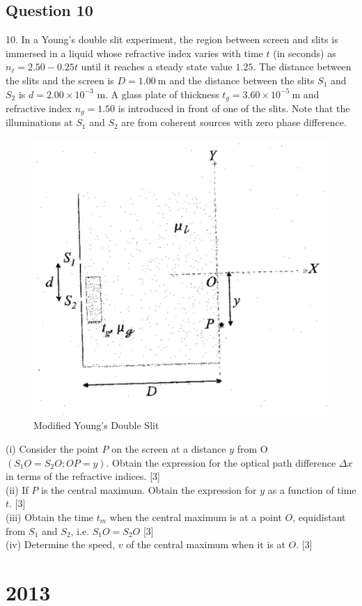 \documentclass{article}
\begin{document}
\subsection{Question 10}
10. In a Young's double slit experiment, the region between screen and slits is immersed in a liquid whose refractive index varies with time $t$ (in seconds) as $n_{\ell}=2.50 - 0.25 t$ until it reaches a steady state value $1.25$. The distance between the slits and the screen is $D=1.00 \mathrm{~m}$ and the distance between the slits $S_{1}$ and $S_{2}$ is $d=2.00 \times 10^{-3}$ m. A glass plate of thickness $t_{g}=3.60 \times 10^{-5} \mathrm{~m}$ and refractive index $n_{g}=1.50$ is introduced in front of one of the slits. Note that the illuminations at $S_{1}$ and $S_{2}$ are from coherent sources with zero phase difference.

\begin{figure}
	\centering
	\includegraphics[width=0.5\linewidth]{spho_book_TYS_images/2012q10.png}
	\caption{Modified Young's Double Slit}
\end{figure}

(i) Consider the point $P$ on the screen at a distance $y$ from O $(S_{1} O=S_{2} O ; O P=y)$. Obtain the expression for the optical path difference $\Delta x$ in terms of the refractive indices. [3] \\
(ii) If $P$ is the central maximum. Obtain the expression for $y$ as a function of time $t$. [3] \\
(iii) Obtain the time $t_{m}$ when the central maximum is at a point $O$, equidistant from $S_{1}$ and $S_{2}$, i.e. $S_{1} O=S_{2} O$ [3] \\
(iv) Determine the speed, $v$ of the central maximum when it is at $O$. [3]

\section{2013}
\end{document}
